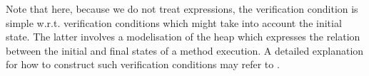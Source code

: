 Note that here, because we do not treat \oldOnly{} expressions, the verification condition is simple w.r.t. 
verification conditions which might take into account the initial state.
 The latter involves a modelisation of the heap which expresses the relation between the initial and final states of a method execution. 
A detailed explanation for how to construct such verification conditions may refer to  \cite{CP03VTO}.

